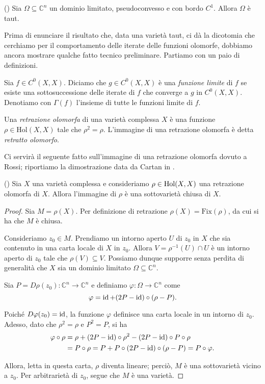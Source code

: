 \begin{prop} \label{psdcvx_is_taut}
    (\cite[Proposition 2]{KR}) Sia $\Omega\subseteq\mathbb{C}^n$ un dominio limitato, pseudoconvesso e con bordo $C^1$. Allora $\Omega$ è taut.
\end{prop}

Prima di enunciare il risultato che, data una varietà taut, ci dà la dicotomia che cerchiamo per il comportamento delle iterate delle funzioni olomorfe, dobbiamo ancora mostrare qualche fatto tecnico preliminare. Partiamo con un paio di definizioni.

\begin{defn}
    Sia $f\in C^0(X,X)$. Diciamo che $g\in C^0(X,X)$ è una \textit{funzione limite} di $f$ se esiste una sottosuccessione delle iterate di $f$ che converge a $g$ in $C^0(X,X)$. Denotiamo con $\Gamma(f)$ l'insieme di tutte le funzioni limite di $f$.
\end{defn}

\begin{defn}
    Una \textit{retrazione olomorfa} di una varietà complessa $X$ è una funzione $\rho\in\text{Hol}(X,X)$ tale che $\rho^2=\rho$. L'immagine di una retrazione olomorfa è detta \textit{retratto olomorfo}.
\end{defn}

Ci servirà il seguente fatto sull'immagine di una retrazione olomorfa dovuto a Rossi; riportiamo la dimostrazione data da Cartan in \cite{Ca}.

\begin{lm}
    (\cite[Section 5]{Ross}) Sia $X$ una varietà complessa e consideriamo $\rho\in\textnormal{Hol}(X,X)$ una retrazione olomorfa di $X$. Allora l'immagine di $\rho$ è una sottovarietà chiusa di $X$.
\end{lm}
\begin{proof}
    Sia $M=\rho(X)$. Per definizione di retrazione $\rho(X)=\text{Fix}(\rho)$, da cui si ha che $M$ è chiusa.
    
    Consideriamo $z_0 \in M$. Prendiamo un intorno aperto $U$ di $z_0$ in $X$ che sia contenuto in una carta locale di $X$ in $z_0$. Allora $V=\rho^{-1}(U)\cap U$ è un intorno aperto di $z_0$ tale che $\rho(V) \subseteq V$. Possiamo dunque supporre senza perdita di generalità che $X$ sia un dominio limitato $\Omega\subseteq\mathbb{C}^n$.

    Sia $P=D\rho(z_0):\mathbb{C}^n \longrightarrow \mathbb{C}^n$ e definiamo $\varphi:\Omega \longrightarrow \mathbb{C}^n$ come
    $$\varphi=\operatorname{id}+(2P-\operatorname{id})\circ(\rho-P).$$

    Poiché $D\varphi(z_0)=\operatorname{id}$, la funzione $\varphi$ definisce una carta locale in un intorno di $z_0$. Adesso, dato che $\rho^2=\rho$ e $P^2=P$, si ha
    \begin{align*}
        \varphi\circ\rho&=\rho+(2P-\operatorname{id})\circ\rho^2-(2P-\operatorname{id})\circ P\circ\rho\\
        &=P\circ\rho=P+P\circ(2P-\operatorname{id})\circ(\rho-P)=P\circ\varphi.
    \end{align*}

    Allora, letta in questa carta, $\rho$ diventa lineare; perciò, $M$ è una sottovarietà vicino a $z_0$. Per arbitrarietà di $z_0$, segue che $M$ è una varietà.
\end{proof}

